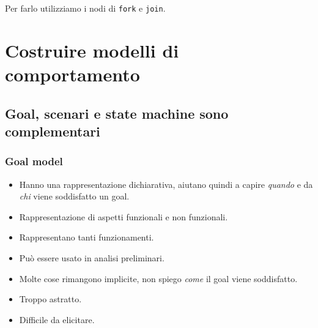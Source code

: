 Per farlo utilizziamo i nodi di \texttt{fork} e \texttt{join}.
\section{Costruire modelli di comportamento}
\subsection{Goal, scenari e state machine sono complementari}
\subsubsection{Goal model}
\begin{tcolorbox}[colback=green!5!white,colframe=green!75!black, title=Vantaggi del goal model]
    \begin{itemize}
        \item Hanno una rappresentazione dichiarativa, aiutano quindi a capire
        \textit{quando} e da \textit{chi} viene soddisfatto un goal.
        \item Rappresentazione di aspetti funzionali e non funzionali.
        \item Rappresentano tanti funzionamenti.
        \item Può essere usato in analisi preliminari.
    \end{itemize}
\end{tcolorbox}
\begin{tcolorbox}[colback=red!5!white,colframe=red!75!black, title=Limiti del goal model]
    \begin{itemize}
        \item Molte cose rimangono implicite, non spiego \textit{come} il goal viene
        soddisfatto.
        \item Troppo astratto.
        \item Difficile da elicitare.
    \end{itemize}
\end{tcolorbox}
